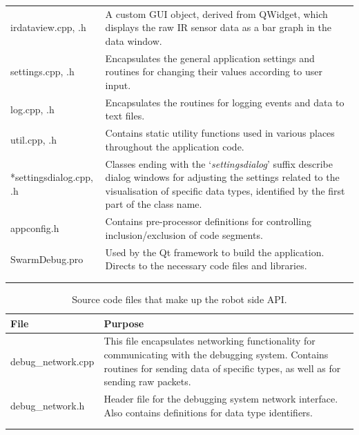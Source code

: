 \begin{longtable}{ l p{10cm} }
 irdataview.cpp, .h & A custom GUI object, derived from QWidget, which displays the raw IR sensor data as a bar graph in the data window.\\
 settings.cpp, .h & Encapsulates the general application settings and routines for changing their values according to user input.\\
 log.cpp, .h & Encapsulates the routines for logging events and data to text files.\\
 util.cpp, .h & Contains static utility functions used in various places throughout the application code.\\
 *settingsdialog.cpp, .h & Classes ending with the `\textit{settingsdialog}' suffix describe dialog windows for adjusting the settings related to the visualisation of specific data types, identified by the first part of the class name.\\
 appconfig.h & Contains pre-processor definitions for controlling inclusion/exclusion of code segments.\\
 SwarmDebug.pro & Used by the Qt framework to build the application. Directs to the necessary code files and libraries.\\
 \bottomrule\\
	
 \label{tab:CodeFiles}
\end{longtable}

\begin{longtable}{ l p{10cm} }
\caption[Robot-side Code Files]{Source code files that make up the robot side API.}\\
 File & Purpose\\
 \hline
 debug\_network.cpp & This file encapsulates networking functionality for communicating with the debugging system. Contains routines for sending data of specific types, as well as for sending raw packets.\\
 debug\_network.h & Header file for the debugging system network interface. Also contains definitions for data type identifiers.\\
 \bottomrule\\
	
 \label{tab:RobotCodeFiles}
\end{longtable}



